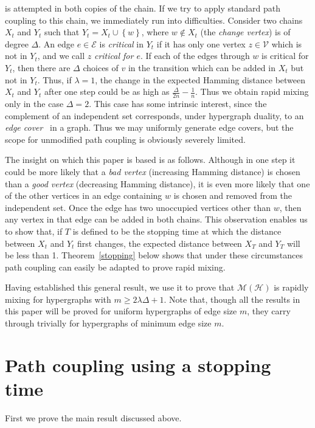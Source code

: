 \documentclass[11pt]{article}
\theoremstyle{definition}
\theoremstyle{remark}
\newcommand{\set}[1]{\left\{#1\right\}}
\newcommand{\M}{\mathcal{M}}
\newcommand{\CE}{\mathcal{E}}
\newcommand{\CH}{\mathcal{H}}
\newcommand{\CV}{\mathcal{V}}
\begin{document}
is attempted in both copies of the chain. If we try to apply standard path
coupling to this chain, we immediately run into difficulties. Consider two
chains $X_t$ and $Y_t$ such that $Y_t=X_t\cup\set{w}$, where $w\notin X_t$
(the \emph{change vertex}) is of degree $\Delta$. An edge $e\in\CE$ is
\emph{critical} in $Y_t$ if it has only one vertex $z\in\CV$ which is not
in $Y_t$, and we call $z$ \emph{critical for $e$}. If each of the edges
through $w$ is critical for $Y_t$, then there are $\Delta$ choices of $v$
in the transition which can be added in $X_t$ but not in $Y_t$. Thus, if
$\lambda=1$, the change in the expected Hamming distance between $X_t$ and
$Y_t$ after one step could be as high as $\frac{\Delta}{2n}-\frac1n$. Thus
we obtain rapid mixing only in the case $\Delta=2$. This case has some
intrinsic interest, since the complement of an independent set corresponds,
under hypergraph duality, to an \emph{edge cover}~\cite{GJ79} in a graph.
Thus we may uniformly generate edge covers, but the scope for unmodified
path coupling is obviously severely limited.

The insight on which this paper is based is as follows. Although in one
step it could be more likely that a \emph{bad vertex} (increasing Hamming
distance) is chosen than a \emph{good vertex} (decreasing Hamming
distance), it is even more likely that one of the other vertices in an edge
containing $w$ is chosen and removed from the independent set. Once the
edge has two unoccupied vertices other than $w$, then any vertex in that
edge can be added in both chains. This observation enables us to show that,
if $T$ is defined to be the stopping time at which the distance between
$X_t$ and $Y_t$ first changes, the expected distance between $X_T$ and
$Y_T$ will be less than 1. Theorem~\ref{stopping} below shows that under
these circumstances path coupling can easily be adapted to prove rapid
mixing.

Having established this general result, we use it to prove that $\M(\CH)$
is rapidly mixing for hypergraphs with $m\geq 2\lambda\Delta+1$. Note that,
though all the results in this paper will be proved for uniform hypergraphs
of edge size $m$, they carry through trivially for hypergraphs of minimum
edge size $m$.

\section{Path coupling using a stopping time}\label{sec:stopping}

First we prove the main result discussed above.
\end{document}

